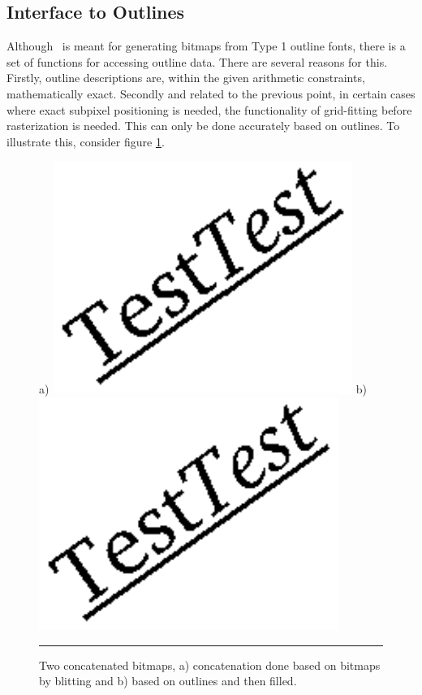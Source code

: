 \subsection{Interface to Outlines}
\label{outlines}%
Although \tonelib\ is meant for generating bitmaps from Type 1 outline fonts,
there is a set of functions for accessing outline data. 
There are several reasons for this. Firstly, outline
descriptions are, within the given arithmetic constraints, mathematically exact.
Secondly and related to the previous point, in certain cases where exact
subpixel positioning is needed, the functionality of grid-fitting before
rasterization is needed. This can only be done accurately based on
outlines. To illustrate this, consider figure \ref{figure:whyoutlines}.
%
\begin{figure}[t]
\hfill
a) \includegraphics[scale=1.0]{concatglyphs}
\hfill
b) \includegraphics[scale=1.0]{concatoutlines}
\hfill\break
\vskip3mm
\hrule\vskip3mm\small
\caption{\label{figure:whyoutlines}Two concatenated bitmaps, a) concatenation
  done based on bitmaps by blitting and b) based on outlines and then filled.} 
\end{figure}
